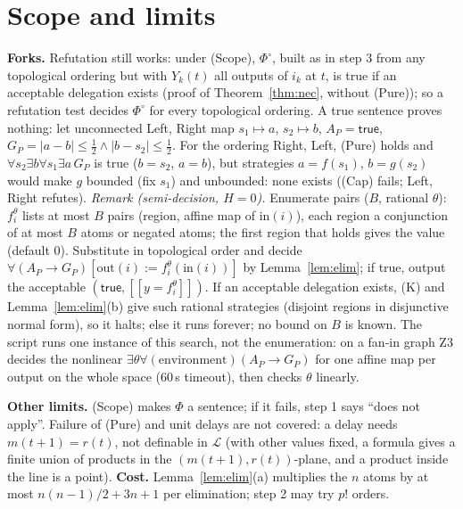 \documentclass[10pt]{article}
\theoremstyle{tplain}\newtheorem{theorem}{Theorem}\newtheorem{lemma}[theorem]{Lemma}\newtheorem{proposition}[theorem]{Proposition}\newtheorem{corollary}[theorem]{Corollary}
\theoremstyle{tdef}\newtheorem{definition}[theorem]{Definition}
\newcommand{\inp}{\mathrm{in}}\newcommand{\outp}{\mathrm{out}}\newcommand{\ports}{\mathrm{ports}}
\newcommand{\TRUE}{\mathsf{true}}\newcommand{\FALSE}{\mathsf{false}}
\newcommand{\df}[1]{[\![#1]\!]}
\begin{document}
\section{Scope and limits}\label{sec:scope}
\textbf{Forks.} Refutation still works: under (Scope), $\Phi^\circ$, built as in step 3 from any topological ordering but with $Y_k(t)$ all outputs of $i_k$ at $t$, is true if an acceptable delegation exists (proof of Theorem~\ref{thm:nec}, without (Pure)); so a refutation test decides $\Phi^\circ$ for every topological ordering. A true sentence proves nothing: let unconnected Left, Right map $s_1\mapsto a$, $s_2\mapsto b$, $A_P=\TRUE$, $G_P=|a-b|\le\frac12\wedge|b-s_2|\le\frac12$. For the ordering Right, Left, (Pure) holds and $\forall s_2\exists b\forall s_1\exists a\,G_P$ is true ($b=s_2$, $a=b$), but strategies $a=f(s_1)$, $b=g(s_2)$ would make $g$ bounded (fix $s_1$) and unbounded: none exists ((Cap) fails; Left, Right refutes). \emph{Remark (semi-decision, $H=0$).} Enumerate pairs ($B$, rational $\theta$): $f_i^\theta$ lists at most $B$ pairs (region, affine map of $\inp(i)$), each region a conjunction of at most $B$ atoms or negated atoms; the first region that holds gives the value (default $0$). Substitute in topological order and decide $\forall(A_P\to G_P)[\outp(i):=f_i^\theta(\inp(i))]$ by Lemma~\ref{lem:elim}; if true, output the acceptable $(\TRUE,\df{y=f_i^\theta})$. If an acceptable delegation exists, (K) and Lemma~\ref{lem:elim}(b) give such rational strategies (disjoint regions in disjunctive normal form), so it halts; else it runs forever; no bound on $B$ is known. The script runs one instance of this search, not the enumeration: on a fan-in graph Z3 decides the nonlinear $\exists\theta\forall(\text{environment})(A_P\to G_P)$ for one affine map per output on the whole space (60\,s timeout), then checks $\theta$ linearly.

\textbf{Other limits.} (Scope) makes $\Phi$ a sentence; if it fails, step 1 says ``does not apply''. Failure of (Pure) and unit delays are not covered: a delay needs $m(t+1)=r(t)$, not definable in $\mathcal L$ (with other values fixed, a formula gives a finite union of products in the $(m(t+1),r(t))$-plane, and a product inside the line is a point). \textbf{Cost.} Lemma~\ref{lem:elim}(a) multiplies the $n$ atoms by at most $n(n-1)/2+3n+1$ per elimination; step 2 may try $p!$ orders.
\end{document}
